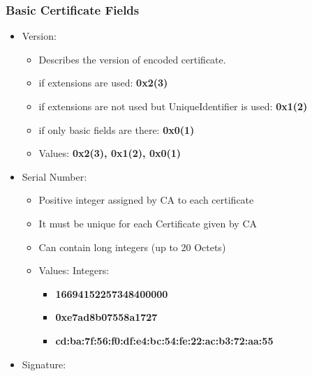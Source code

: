 \documentclass[12pt]{report}
\begin{document}
    \subsubsection{Basic Certificate Fields}
        \begin{itemize}
            \item Version:
                \begin{itemize}
                    \item Describes the version of encoded certificate.
                    \item if extensions are used: \textbf{0x2(3)}
                    \item if extensions are not used but UniqueIdentifier is used: \textbf{0x1(2)}
                    \item if only basic fields are there: \textbf{0x0(1)}
                \end{itemize}
                \begin{itemize}
                    \item Values: \textbf{0x2(3), 0x1(2), 0x0(1)}
                \end{itemize}
            \item Serial Number:
                \begin{itemize}
                    \item Positive integer assigned by CA to each certificate
                    \item It must be unique for each Certificate given by CA
                    \item Can contain long integers (up to 20 Octets)
                \end{itemize}
                \begin{itemize}
                    \item Values: Integers: 
                    \begin{itemize}
                        \item \textbf{16694152257348400000}
                        \item \textbf{0xe7ad8b07558a1727}
                        \item \textbf{cd:ba:7f:56:f0:df:e4:bc:54:fe:22:ac:b3:72:aa:55}
                    \end{itemize}
                \end{itemize}
            \item Signature:
                \begin{itemize}

\end{itemize}
\end{itemize}
\end{document}
